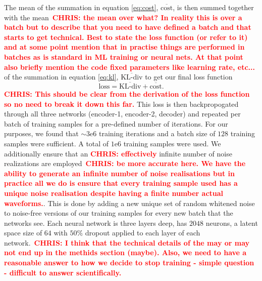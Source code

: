 \documentclass[%
showpacs,
 amsmath,amssymb,
 aps,
 twocolumn,
 prl,
 reprint,
floatfix,
]{revtex4-1}
\newcommand{\chris}[1]{\textbf{\textcolor{red}{CHRIS: #1}}}
\begin{document}
The mean of the summation in equation \ref{eq:cost},
$\overline{\textrm{cost}}$, is then summed together with the mean~\chris{the
mean over what? In reality this is over a batch but to describe that you need
to have defined a batch and that starts to get technical. Best to state the
loss function (or refer to it) and at some point mention that in practise
things are performed in batches as is standard in ML training or neural nets.
At that point also briefly mention the code fixed parameters like learning
rate, etc...} of the summation in equation \ref{eq:kl},
$\overline{\textrm{KL-div}}$ to get our final loss function
%
\begin{equation} 
\textrm{loss} = \overline{\textrm{KL-div}} + \overline{\textrm{cost}}.  
\end{equation}
%
\chris{This should be clear from the derivation of the loss function so no need
to break it down this far.} This loss is then backpropogated through all three
networks (encoder-1, encoder-2, decoder) and repeated per batch of training
samples for a pre-defined number of iterations. For our purposes, we found that
$\sim3\textrm{e}6$ training iterations and a batch size of $128$ training
samples were sufficient. A total of $1\textrm{e}6$ training samples were used.
We additionally ensure that an \chris{effectively} infinite number of noise
realizations are employed~\chris{be more accurate here. We have the ability to
generate an infinite number of noise realisations but in practice all we do is
ensure that every training sample used has a unique noise realisation despite
having a finite number actual waveforms.}. This is done by adding a new unique
set of random whitened noise to noise-free versions of our training samples for
every new batch that the networks see. Each neural network is three layers
deep, has $2048$ neurons, a latent space size of $64$ with $50\%$ dropout
applied to each layer of each network.~\chris{I think that the technical
details of the may or may not end up in the methids section (maybe). Also, we
need to have a reasonable answer to how we decide to stop training - simple
question - difficult to answer scientifically.}
\end{document}
